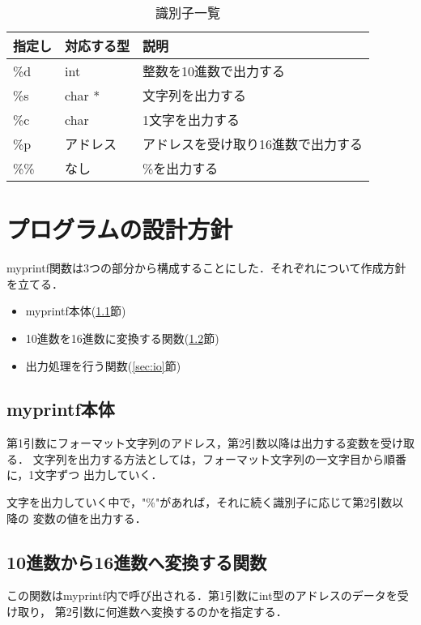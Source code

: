 \documentclass[11pt]{jarticle}
\begin{document}
\begin{table}[h]
  \begin{center}
  \label{table:ident}
  \caption{識別子一覧}
    \begin{tabular}{l|l|l}
      指定し & 対応する型 & 説明 \\ \hline
      \%d & int & 整数を10進数で出力する \\
      \%s & char * & 文字列を出力する \\
      \%c & char & 1文字を出力する \\
      \%p & アドレス & アドレスを受け取り16進数で出力する \\
      \%\% & なし & \%を出力する
    \end{tabular}
\end{center}
\end{table}

\section{プログラムの設計方針} \label{sec:policy}

myprintf関数は3つの部分から構成することにした．それぞれについて作成方針を立てる．

\begin{itemize}
  \item myprintf本体(\ref{sec:myprintf}節)
  \item 10進数を16進数に変換する関数(\ref{sec:16base}節)
  \item 出力処理を行う関数(\ref{sec:io}節)
\end{itemize}

\subsection{myprintf本体} \label{sec:myprintf}

第1引数にフォーマット文字列のアドレス，第2引数以降は出力する変数を受け取る．
文字列を出力する方法としては，フォーマット文字列の一文字目から順番に，1文字ずつ
出力していく．

文字を出力していく中で，"\%"があれば，それに続く識別子に応じて第2引数以降の
変数の値を出力する．

\subsection{10進数から16進数へ変換する関数} \label{sec:16base}

この関数はmyprintf内で呼び出される．第1引数にint型のアドレスのデータを受け取り，
第2引数に何進数へ変換するのかを指定する．
\end{document}
